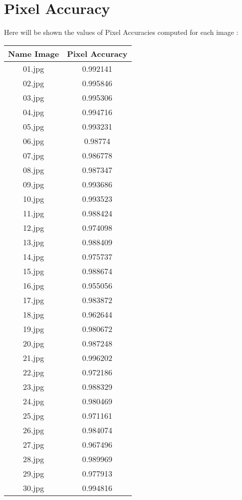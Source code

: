 \section{Pixel Accuracy}
\noindent
Here will be shown the values of Pixel Accuracies computed for each image :
    \begin{longtable}{|c|c|}\hline
        Name Image & Pixel Accuracy\\\hline
        01.jpg & 0.992141 \\\hline
        02.jpg & 0.995846 \\\hline
        03.jpg & 0.995306 \\\hline
        04.jpg & 0.994716 \\\hline
        05.jpg & 0.993231 \\\hline
        06.jpg & 0.98774 \\\hline
        07.jpg & 0.986778 \\\hline
        08.jpg & 0.987347 \\\hline
        09.jpg & 0.993686 \\\hline
        10.jpg & 0.993523 \\\hline
        11.jpg & 0.988424 \\\hline
        12.jpg & 0.974098 \\\hline
        13.jpg & 0.988409 \\\hline
        14.jpg & 0.975737 \\\hline
        15.jpg & 0.988674 \\\hline
        16.jpg & 0.955056 \\\hline
        17.jpg & 0.983872 \\\hline
        18.jpg & 0.962644 \\\hline
        19.jpg & 0.980672 \\\hline
        20.jpg & 0.987248 \\\hline
        21.jpg & 0.996202 \\\hline
        22.jpg & 0.972186 \\\hline
        23.jpg & 0.988329 \\\hline
        24.jpg & 0.980469 \\\hline
        25.jpg & 0.971161 \\\hline
        26.jpg & 0.984074 \\\hline
        27.jpg & 0.967496 \\\hline
        28.jpg & 0.989969 \\\hline
        29.jpg & 0.977913 \\\hline
        30.jpg & 0.994816 \\\hline
    \end{longtable}    
